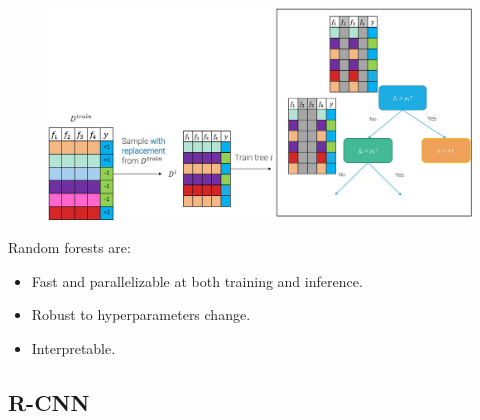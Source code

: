 \begin{description}
\begin{description}
\begin{description}
                        \begin{figure}[H]
                            \raggedleft
                            \includegraphics[width=0.7\linewidth]{./img/_random_forest_random_splitting.jpg}
                        \end{figure}
                \end{description}

                \begin{remark}
                    Random forests are:
                    \begin{itemize}
                        \item Fast and parallelizable at both training and inference.
                        \item Robust to hyperparameters change.
                        \item Interpretable.
                    \end{itemize}
                \end{remark}
        \end{description}
\end{description}


\subsection{R-CNN}

